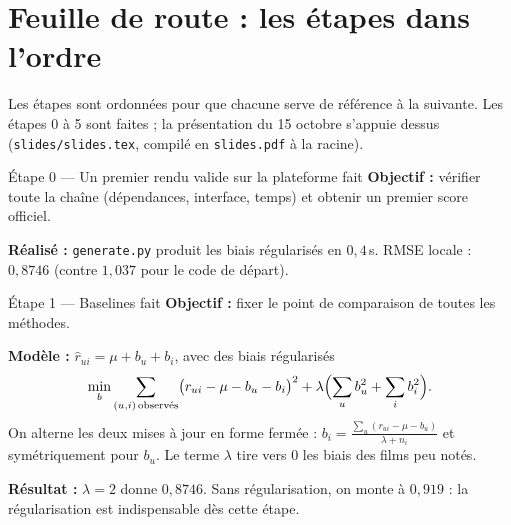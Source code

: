\documentclass[11pt,a4paper]{article}
\newcommand{\rhat}{\hat r}
\begin{document}
\section{Feuille de route : les étapes dans l'ordre}

Les étapes sont ordonnées pour que chacune serve de référence à la suivante.
Les étapes 0 à 5 sont faites ; la présentation du 15 octobre s'appuie dessus
(\texttt{slides/slides.tex}, compilé en \texttt{slides.pdf} à la racine).

\begin{etape}{Étape 0 --- Un premier rendu valide sur la plateforme \hfill \textcolor{ok}{fait}}
\textbf{Objectif :} vérifier toute la chaîne (dépendances, interface, temps) et
obtenir un premier score officiel.

\textbf{Réalisé :} \texttt{generate.py} produit les biais régularisés en
$0{,}4$\,s. RMSE locale : $0{,}8746$ (contre $1{,}037$ pour le code de départ).
\end{etape}

\begin{etape}{Étape 1 --- Baselines \hfill \textcolor{ok}{fait}}
\textbf{Objectif :} fixer le point de comparaison de toutes les méthodes.

\textbf{Modèle :} $\rhat_{ui} = \mu + b_u + b_i$, avec des biais régularisés
\[
  \min_{b} \sum_{(u,i)\,\text{observés}} \bigl(r_{ui} - \mu - b_u - b_i\bigr)^2
  + \lambda \Bigl(\sum_u b_u^2 + \sum_i b_i^2\Bigr).
\]
On alterne les deux mises à jour en forme fermée :
$b_i = \frac{\sum_{u} (r_{ui} - \mu - b_u)}{\lambda + n_i}$ et symétriquement
pour $b_u$. Le terme $\lambda$ tire vers 0 les biais des films peu notés.

\textbf{Résultat :} $\lambda = 2$ donne $0{,}8746$. Sans régularisation, on
monte à $0{,}919$ : la régularisation est indispensable dès cette étape.
\end{etape}
\end{document}
